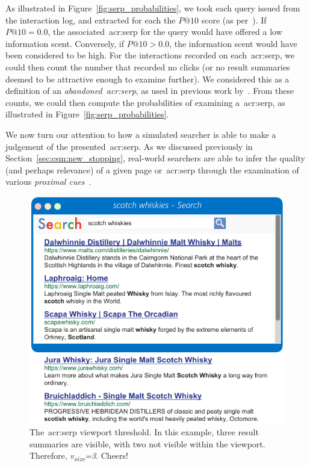As illustrated in Figure~\ref{fig:serp_probabilities}, we took each query issued from the interaction log, and extracted for each the $P@10$ score (as per~\cite{wu2014information_scent}). If $P@10=0.0$, the associated~\gls{acr:serp} for the query would have offered a low information scent. Conversely, if $P@10 > 0.0$, the information scent would have been considered to be high. For the interactions recorded on each~\gls{acr:serp}, we could then count the number that recorded no clicks (or no result summaries deemed to be attractive enough to examine further). We considered this as a definition of an \emph{abandoned~\gls{acr:serp}}, as used in previous work by~\cite{hassan2013serp_abandonment}. From these counts, we could then compute the probabilities of examining a~\gls{acr:serp}, as illustrated in Figure~\ref{fig:serp_probabilities}.

We now turn our attention to how a simulated searcher is able to make a judgement of the presented~\gls{acr:serp}. As we discussed previously in Section~\ref{sec:csm:new_stopping}, real-world searchers are able to infer the quality (and perhaps relevance) of a given page or~\gls{acr:serp} through the examination of various \emph{proximal cues}~\citep{chi2001information_scent}.

\begin{figure}
    \begin{center}
    \vspace*{-10mm}
    \includegraphics[width=1\textwidth]{figures/ch6-viewport.pdf}
    \end{center}
    \vspace*{-4mm}
    \caption[Viewport cutoff example]{The~\gls{acr:serp} viewport threshold. In this example, three result summaries are visible, with two not visible within the viewport. Therefore, \emph{v\textsubscript{size}=3}. Cheers!}
    \label{fig:viewport_cutoff}
\end{figure}

